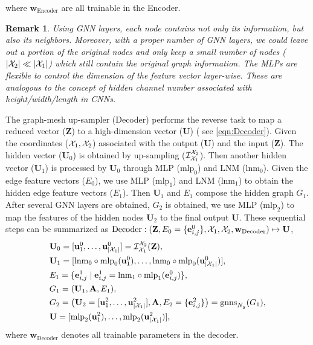 \documentclass{article}
\newtheorem{remark}{Remark}
\begin{document}
where $\mathbf{w}_\mathrm{Encoder}$ are all trainable in the Encoder.

\begin{remark}
Using GNN layers, each node contains not only its information, but also its neighbors. Moreover, with a proper number of GNN layers, we could leave out a portion of the original nodes and only keep a small number of nodes ($|\mathcal{X}_2|\ll|\mathcal{X}_1| $) which still contain the original graph information. The MLPs are flexible to control the dimension of the feature vector layer-wise. These are analogous to the concept of hidden channel number associated with height/width/length in CNNs.
\end{remark}

The graph-mesh up-sampler (Decoder) performs the reverse task to map a reduced vector ($\mathbf{Z}$) to a high-dimension vector ($\mathbf{U}$) ( see \eqref{eqn:Decoder}). Given the coordinates ($\mathcal{X}_1, \mathcal{X}_2$) associated with the output ($\mathbf{U}$) and the input ($\mathbf{Z}$). The hidden vector ($\mathbf{U}_0$) is obtained by up-sampling ($\mathcal{I}^{\mathcal{X}_2}_{\mathcal{X}_1}$). Then another hidden vector ($\mathbf{U}_1$) is processed by $\mathbf{U}_0$ through MLP ($\mathrm{mlp}_0$) and LNM ($\mathrm{lnm}_0$).  Given the edge feature vectors ($E_0$), we use MLP ($\mathrm{mlp}_1$) and LNM ($\mathrm{lnm}_1$) to obtain the hidden edge feature vectors ($E_1$). Then $\mathbf{U}_1$ and $E_1$ compose the hidden graph $G_1$. After several GNN layers are obtained, $G_2$ is obtained, we use MLP ($\mathrm{mlp}_2$) to map the features of the hidden nodes $\mathbf{U}_2$ to the final output $\mathbf{U}$. These sequential steps can be summarized as $\mathrm{Decoder}:(\mathbf{Z}, E_0=\{\mathbf{e}^0_{i,j}\},\mathcal{X}_1,\mathcal{X}_2,\mathbf{w}_{\mathrm{Decoder}})\mapsto \mathbf{U}$, 
    \begin{equation}
        \begin{split}
            &\mathbf{U}_0 = [\mathbf{u}_1^0,\dots,\mathbf{u}_{|\mathcal{X}_1|}^0] = \mathcal{I}^{\mathcal{X}_2}_{\mathcal{X}_1}(\mathbf{Z}),\\
            &\mathbf{U}_1=[\mathrm{lnm}_0\circ\mathrm{mlp}_0(\mathbf{u}^0_1),\dots,\mathrm{lnm}_0\circ\mathrm{mlp}_0(\mathbf{u}_{|\mathcal{X}_1|}^0)],\\
            &E_1=\{\mathbf{e}_{i,j}^1\;|\; \mathbf{e}_{i,j}^1=\mathrm{lnm}_1\circ\mathrm{mlp}_1(\mathbf{e}^0_{i,j})           \},\\
            &G_1 = (\mathbf{U}_1,\mathbf{A},E_1),\\
            &G_2 = \big(\mathbf{U}_2=[\mathbf{u}_1^2,\dots,\mathbf{u}_{|\mathcal{X}_1|}^2],\mathbf{A},E_2=\{\mathbf{e}^2_{i,j}\}  \big) = \mathrm{gnns}_{N_g}(G_1),\\
            &\mathbf{U}=[\mathrm{mlp}_2(\mathbf{u}^2_1),\dots,\mathrm{mlp}_2(\mathbf{u}_{|\mathcal{X}_1|}^2)],
        \end{split}
        \label{eqn:Decoder}
    \end{equation}
where $\mathbf{w}_\mathrm{Decoder}$ denotes all trainable parameters in the decoder.
\end{document}
